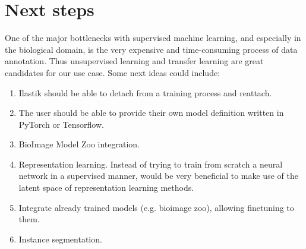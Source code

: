 \documentclass[12pt, a4paper]{article}
\begin{document}
\section{Next steps}
\label{sec:next_steps}

One of the major bottlenecks with supervised machine learning, and especially in the biological domain, is the very expensive and time-consuming process of data annotation. Thus unsupervised learning and transfer learning are great candidates for our use case. Some next ideas could include:

\begin{enumerate}
    \item Ilastik should be able to detach from a training process and reattach.
    \item The user should be able to provide their own model definition written in PyTorch or Tensorflow.
    \item BioImage Model Zoo integration.
    \item Representation learning. Instead of trying to train from scratch a neural network in a supervised manner, would be very beneficial to make use of the latent space of representation learning methods.
    \item Integrate already trained models (e.g. bioimage zoo), allowing finetuning to them.
    \item Instance segmentation.
\end{enumerate}

\clearpage



\end{document}
